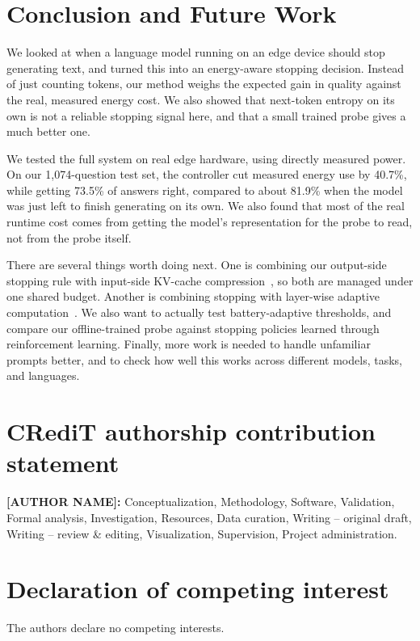 \documentclass[review,12pt]{elsarticle}
\begin{document}
\section{Conclusion and Future Work}
\label{sec:conclusion}

We looked at when a language model running on an edge device should
stop generating text, and turned this into an energy-aware stopping
decision. Instead of just counting tokens, our method weighs the
expected gain in quality against the real, measured energy cost. We
also showed that next-token entropy on its own is not a reliable
stopping signal here, and that a small trained probe gives a much
better one.

We tested the full system on real edge hardware, using directly
measured power. On our 1{,}074-question test set, the controller cut
measured energy use by 40.7\%, while getting 73.5\% of answers right,
compared to about 81.9\% when the model was just left to finish
generating on its own. We also found that most of the real runtime
cost comes from getting the model's representation for the probe to
read, not from the probe itself.

There are several things worth doing next. One is combining our
output-side stopping rule with input-side KV-cache
compression~\cite{xiao2024streamingllm,zhang2023h2o}, so both are
managed under one shared budget. Another is combining stopping with
layer-wise adaptive
computation~\cite{schuster2022calm,elhoushi2024layerskip}. We also
want to actually test battery-adaptive thresholds, and compare our
offline-trained probe against stopping policies learned through
reinforcement learning. Finally, more work is needed to handle
unfamiliar prompts better, and to check how well this works across
different models, tasks, and languages.


\section*{CRediT authorship contribution statement}
\textbf{[AUTHOR NAME]:} Conceptualization, Methodology, Software,
Validation, Formal analysis, Investigation, Resources, Data curation,
Writing -- original draft, Writing -- review \& editing,
Visualization, Supervision, Project administration.

\section*{Declaration of competing interest}
The authors declare no competing interests.
\end{document}
